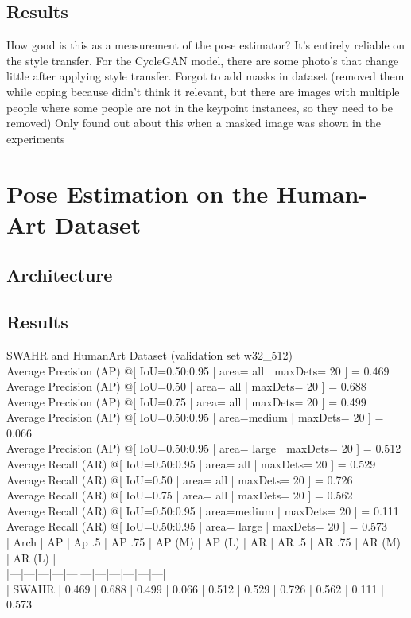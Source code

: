 \subsection{Results}
How good is this as a measurement of the pose estimator?
It's entirely reliable on the style transfer.
For the CycleGAN model, there are some photo's that change little after applying style transfer.
Forgot to add masks in dataset (removed them while coping because didn't think it relevant, but there are images with multiple people where some people are not in the keypoint instances, so they need to be removed)
Only found out about this when a masked image was shown in the experiments
\label{sec:baseline_coco_style_transfer_results}

\section{Pose Estimation on the Human-Art Dataset}
\label{sec:baseline_human_art}

\subsection{Architecture}
\label{sec:baseline_human_art_architecture}

\subsection{Results}
\label{sec:baseline_human_art_results}

SWAHR and HumanArt Dataset (validation set w32\_512)\\
Average Precision  (AP) @[ IoU=0.50:0.95 | area=   all | maxDets= 20 ] = 0.469\\
 Average Precision  (AP) @[ IoU=0.50      | area=   all | maxDets= 20 ] = 0.688\\
 Average Precision  (AP) @[ IoU=0.75      | area=   all | maxDets= 20 ] = 0.499\\
 Average Precision  (AP) @[ IoU=0.50:0.95 | area=medium | maxDets= 20 ] = 0.066\\
 Average Precision  (AP) @[ IoU=0.50:0.95 | area= large | maxDets= 20 ] = 0.512\\
 Average Recall     (AR) @[ IoU=0.50:0.95 | area=   all | maxDets= 20 ] = 0.529\\
 Average Recall     (AR) @[ IoU=0.50      | area=   all | maxDets= 20 ] = 0.726\\
 Average Recall     (AR) @[ IoU=0.75      | area=   all | maxDets= 20 ] = 0.562\\
 Average Recall     (AR) @[ IoU=0.50:0.95 | area=medium | maxDets= 20 ] = 0.111\\
 Average Recall     (AR) @[ IoU=0.50:0.95 | area= large | maxDets= 20 ] = 0.573\\
| Arch | AP | Ap .5 | AP .75 | AP (M) | AP (L) | AR | AR .5 | AR .75 | AR (M) | AR (L) |\\
|---|---|---|---|---|---|---|---|---|---|---|\\
| SWAHR | 0.469 | 0.688 | 0.499 | 0.066 | 0.512 | 0.529 | 0.726 | 0.562 | 0.111 | 0.573 |\\

